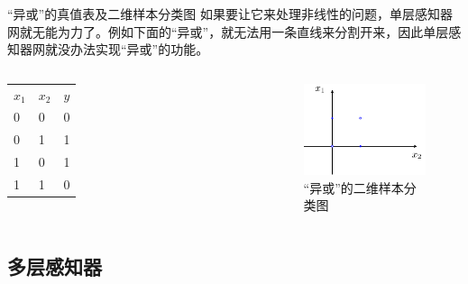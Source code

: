 \documentclass[xcolor=svgnames]{beamer}
\begin{document}
\begin{frame}{``异或''的真值表及二维样本分类图}
  如果要让它来处理非线性的问题，单层感知器网就无能为力了。例如下面的“异或”，就无法用一条直线来分割开来，因此单层感知器网就没办法实现“异或”的功能。
  \begin{columns}
    \begin{table}
      \centering
      \begin{tabular}[b] {lll}
        $x_1$ & $x_2$ & $y$ \\
	0 & 0 & 0\\
	0 & 1 & 1\\
	1 & 0 & 1\\
	1 & 1 & 0\\
      \end{tabular}
    \end{table}
    \begin{figure}
      \centering
      \includegraphics[width=\textwidth]{fig34.pdf}
      \caption{``异或''的二维样本分类图}
      \label{fig:logicxor}
    \end{figure}
  \end{columns}
\end{frame}

\subsection{多层感知器}
\label{sec:multilayer}
\end{document}
